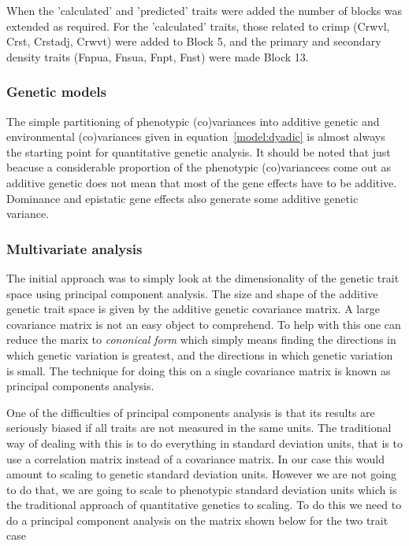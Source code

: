 \documentclass[titlepage]{article}  %
\begin{document}
When the 'calculated' and 'predicted' traits were added the number of blocks was extended as required. For the 'calculated' traits, those related to crimp (Crwvl, Crst, Crstadj, Crwvt) were added to Block 5, and the primary and secondary density traits (Fnpua, Fnsua, Fnpt, Fnst) were made Block 13.

\subsubsection{Genetic models}
The simple partitioning of phenotypic (co)variances into additive genetic and environmental (co)variances given in equation~\ref{model:dyadic} is almost always the starting point for quantitative genetic analysis. It should be noted that just beacuse a considerable proportion of the phenotypic (co)variancees come out as additive genetic does not mean that most of the gene effects have to be additive. Dominance and epistatic gene effects also generate some additive genetic variance. 


\subsubsection{Multivariate analysis}
The initial approach was to simply look at the dimensionality of the genetic trait space using principal component analysis. The size and shape of the additive genetic trait space is given by the additive genetic covariance matrix. A large covariance matrix is not an easy object to comprehend. To help with this one can reduce the marix to {\em cononical form} which simply means finding the directions in which genetic variation is greatest, and the directions in which genetic variation is small. The technique for doing this on a single covariance matrix is known as principal components analysis.

One of the difficulties of principal components analysis is that its results are seriously biased if all traits are not measured in the same units. The traditional way of dealing with this is to do everything in standard deviation units, that is to use a correlation matrix instead of a covariance matrix. In our case this would amount to scaling to genetic standard deviation units. However we are not going to do that, we are going to scale to phenotypic standard deviation units which is the traditional approach of quantitative genetics to scaling. To do this we need to do a principal component analysis on the matrix shown below for the two trait case
\end{document}
